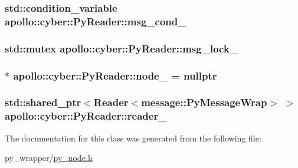 \hypertarget{classapollo_1_1cyber_1_1PyReader_afef93e420ce1fe81783ee2e533aff74b}{
\subsubsection[{msg\-\_\-cond\-\_\-}]{\setlength{\rightskip}{0pt plus 5cm}std\-::condition\-\_\-variable apollo\-::cyber\-::\-Py\-Reader\-::msg\-\_\-cond\-\_\-\hspace{0.3cm}{\ttfamily [private]}}}\label{classapollo_1_1cyber_1_1PyReader_afef93e420ce1fe81783ee2e533aff74b}
\hypertarget{classapollo_1_1cyber_1_1PyReader_a65d8b0d144d43363766a7b30739d3ae9}{
\subsubsection[{msg\-\_\-lock\-\_\-}]{\setlength{\rightskip}{0pt plus 5cm}std\-::mutex apollo\-::cyber\-::\-Py\-Reader\-::msg\-\_\-lock\-\_\-\hspace{0.3cm}{\ttfamily [private]}}}\label{classapollo_1_1cyber_1_1PyReader_a65d8b0d144d43363766a7b30739d3ae9}
\hypertarget{classapollo_1_1cyber_1_1PyReader_a536eec8704c82a257a9d5055ce423186}{
\subsubsection[{node\-\_\-}]{$\ast$ apollo\-::cyber\-::\-Py\-Reader\-::node\-\_\- = nullptr\hspace{0.3cm}{\ttfamily [private]}}}\label{classapollo_1_1cyber_1_1PyReader_a536eec8704c82a257a9d5055ce423186}
\hypertarget{classapollo_1_1cyber_1_1PyReader_abf457a5943e3bb6e4ad42349ff864688}{
\subsubsection[{reader\-\_\-}]{\setlength{\rightskip}{0pt plus 5cm}std\-::shared\-\_\-ptr$<${\bf Reader}$<${\bf message\-::\-Py\-Message\-Wrap}$>$ $>$ apollo\-::cyber\-::\-Py\-Reader\-::reader\-\_\-\hspace{0.3cm}{\ttfamily [private]}}}\label{classapollo_1_1cyber_1_1PyReader_abf457a5943e3bb6e4ad42349ff864688}


The documentation for this class was generated from the following file\-:\begin{DoxyCompactItemize}
\item 
py\-\_\-wrapper/\hyperlink{py__node_8h}{py\-\_\-node.\-h}\end{DoxyCompactItemize}
